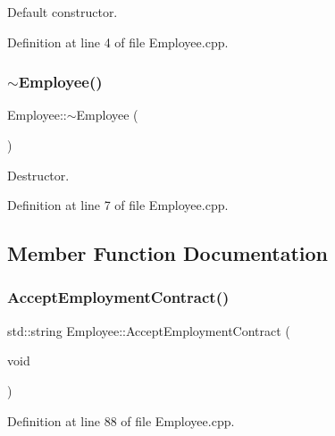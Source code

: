 Default constructor. 



Definition at line 4 of file Employee.\+cpp.

\mbox{\label{class_employee_abed56e9c007fff2bfe27ca87251baaf2}} 
\subsubsection{\texorpdfstring{$\sim$\+Employee()}{~Employee()}}
{\footnotesize\ttfamily Employee\+::$\sim$\+Employee (\begin{DoxyParamCaption}{ }\end{DoxyParamCaption})}



Destructor. 



Definition at line 7 of file Employee.\+cpp.



\subsection{Member Function Documentation}
\mbox{\label{class_employee_ad7a5d34564702bc8b880db1714c75413}} 
\subsubsection{\texorpdfstring{Accept\+Employment\+Contract()}{AcceptEmploymentContract()}}
{\footnotesize\ttfamily std\+::string Employee\+::\+Accept\+Employment\+Contract (\begin{DoxyParamCaption}\item[{void}]{ }\end{DoxyParamCaption})}



Definition at line 88 of file Employee.\+cpp.

